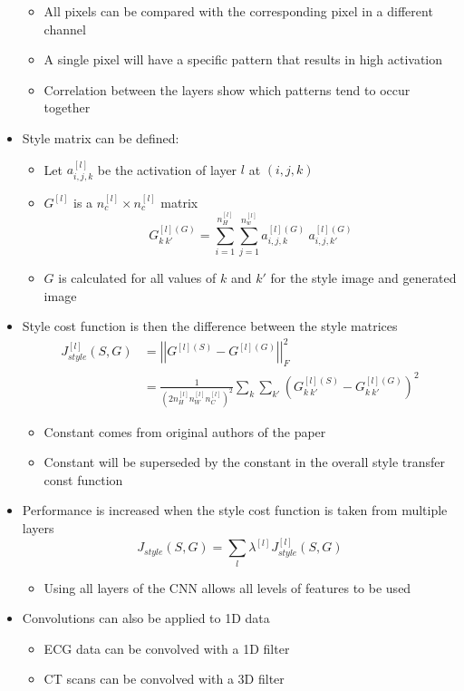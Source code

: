 \documentclass[12pt, letterpaper]{article}
\begin{document}
\begin{itemize}
        \begin{itemize}
            \item All pixels can be compared with the corresponding pixel in a different channel
            \item A single pixel will have a specific pattern that results in high activation
            \item Correlation between the layers show which patterns tend to occur together
        \end{itemize}
        \item Style matrix can be defined:
        \begin{itemize}
            \item Let $a_{i,j,k}^{[l]}$ be the activation of layer $l$ at $(i,j,k)$
            \item $G^{[l]}$ is a $n_c^{[l]}\times n_c^{[l]}$ matrix 
            $$G^{[l](G)}_{k~k'}=\sum_{i=1}^{n_H^{[l]}}\sum_{j=1}^{n_w^{[l]}}a^{[l](G)}_{i,j,k}~a^{[l](G)}_{i,j,k'}$$
            \item $G$ is calculated for all values of $k$ and $k'$ for the style image and generated image
        \end{itemize}
        \item Style cost function is then the difference between the style matrices
        \begin{align*}
            J_{style}^{[l]}(S,G)&=\left|\left|G^{[l](S)}-G^{[l](G)}\right|\right|^2_F \\
            &=\frac{1}{\left(2n_H^{[l]}n_W^{[l]}n_C^{[l]}\right)^2}\sum_k\sum_{k'}\left(G_{k~k'}^{[l](S)}-G_{k~k'}^{[l](G)}\right)^2
        \end{align*}
        \begin{itemize}
            \item Constant comes from original authors of the paper
            \item Constant will be superseded by the constant in the overall style transfer const function
        \end{itemize}
        \item Performance is increased when the style cost function is taken from multiple layers
        $$J_{style}(S,G)=\sum_l\lambda^{[l]}J_{style}^{[l]}(S,G)$$
        \begin{itemize}
            \item Using all layers of the CNN allows all levels of features to be used
        \end{itemize}
        \item Convolutions can also be applied to 1D data
        \begin{itemize}
            \item ECG data can be convolved with a 1D filter
            \item CT scans can be convolved with a 3D filter
        \end{itemize}
    \end{itemize}
    
\end{document}
